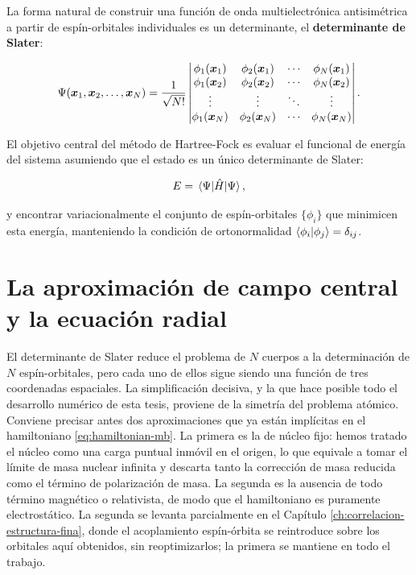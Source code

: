 La forma natural de construir una función de onda multielectrónica antisimétrica a partir de espín-orbitales individuales es un determinante, el \textbf{determinante de Slater}:

\begin{equation}
  \Psi(\bm{x}_1, \bm{x}_2, \dots, \bm{x}_N) = \frac{1}{\sqrt{N!}}
  \vmqty{
    \phi_1(\bm{x}_1) & \phi_2(\bm{x}_1) & \cdots & \phi_N(\bm{x}_1) \\
    \phi_1(\bm{x}_2) & \phi_2(\bm{x}_2) & \cdots & \phi_N(\bm{x}_2) \\
    \vdots & \vdots & \ddots & \vdots \\
    \phi_1(\bm{x}_N) & \phi_2(\bm{x}_N) & \cdots & \phi_N(\bm{x}_N)
  }.
\end{equation}

El objetivo central del método de Hartree-Fock es evaluar el funcional de energía del sistema asumiendo que el estado es un único determinante de Slater:

\begin{equation}
  \label{eq:energy-func}
  E = \ev{\hat{H}}{\Psi},
\end{equation}

y encontrar variacionalmente el conjunto de espín-orbitales \( \{ \phi_i \} \) que minimicen esta energía, manteniendo la condición de ortonormalidad \( \braket{\phi_i}{\phi_j} = \delta_{ij} \).

\section{La aproximación de campo central y la ecuación radial}
\label{sec:campo_central}

El determinante de Slater reduce el problema de $N$ cuerpos a la determinación de $N$ espín-orbitales, pero cada uno de ellos sigue siendo una función de tres coordenadas espaciales. La simplificación decisiva, y la que hace posible todo el desarrollo numérico de esta tesis, proviene de la simetría del problema atómico. Conviene precisar antes dos aproximaciones que ya están implícitas en el hamiltoniano \eqref{eq:hamiltonian-mb}. La primera es la de núcleo fijo: hemos tratado el núcleo como una carga puntual inmóvil en el origen, lo que equivale a tomar el límite de masa nuclear infinita y descarta tanto la corrección de masa reducida como el término de polarización de masa. La segunda es la ausencia de todo término magnético o relativista, de modo que el hamiltoniano es puramente electrostático. La segunda se levanta parcialmente en el Capítulo \ref{ch:correlacion-estructura-fina}, donde el acoplamiento espín-órbita se reintroduce sobre los orbitales aquí obtenidos, sin reoptimizarlos; la primera se mantiene en todo el trabajo.

